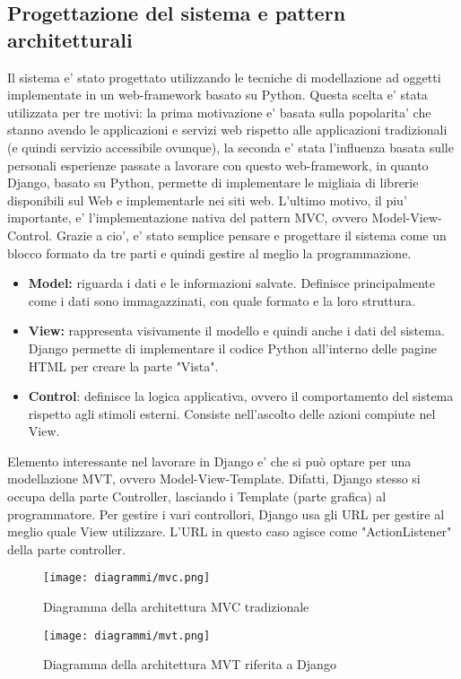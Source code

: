 \documentclass[a4paper, 10pt]{article}
\begin{document}
	\subsection{Progettazione del sistema e pattern architetturali}
	Il sistema e' stato progettato utilizzando le tecniche di modellazione ad oggetti 
	implementate in un web-framework basato su Python. Questa scelta e' stata 
	utilizzata per tre motivi: la prima motivazione e' basata sulla popolarita' 
	che stanno avendo le applicazioni e servizi web rispetto alle applicazioni 
	tradizionali (e quindi servizio accessibile ovunque), la seconda e' stata 
	l'influenza basata sulle personali esperienze passate a lavorare con questo 
	web-framework, in quanto Django, basato su Python, permette di implementare 
	le migliaia di librerie disponibili sul Web e implementarle nei siti web. 
	L'ultimo motivo, il piu' importante, e' l'implementazione nativa del pattern 
	MVC, ovvero Model-View-Control. Grazie a cio', e' stato semplice pensare 
	e progettare il sistema come un blocco formato da tre parti e quindi 
	gestire al meglio la programmazione.
	\begin{itemize}
		\item \textbf{Model:} riguarda i dati e le informazioni salvate. 
		Definisce principalmente come i dati sono immagazzinati, con quale formato
	    e la loro struttura.
		\item \textbf{View:} rappresenta visivamente il modello e quindi 
		anche i dati del sistema. Django permette di implementare il codice 
		Python all'interno delle pagine HTML per creare la parte "Vista".
		\item \textbf{Control}: definisce la logica applicativa, 
		ovvero il comportamento del sistema rispetto agli stimoli 
		esterni. Consiste nell'ascolto delle azioni compiute nel View.
	\end{itemize} Elemento interessante nel lavorare in Django e' 
		che si può optare per una modellazione MVT, ovvero Model-View-Template. Difatti, Django stesso
		si occupa della parte Controller, lasciando i Template (parte grafica) al programmatore. 
		Per gestire i vari controllori, Django usa gli URL per gestire al meglio quale View 
		utilizzare. L'URL in questo caso agisce come "ActionListener" della parte controller.
	
		\begin{figure}[h]
				\centering
				\texttt{[image: diagrammi/mvc.png]}
				\caption{Diagramma della architettura MVC tradizionale}
		\end{figure} 
		\begin{figure}[h]
				\centering
				\texttt{[image: diagrammi/mvt.png]}
				\caption{Diagramma della architettura MVT riferita a Django}
		\end{figure} \clearpage
		
\end{document}
